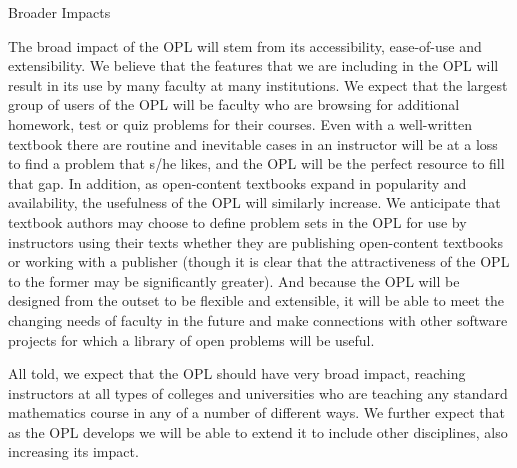 \documentclass[11pt]{article}
\begin{document}
\begin{section}{Broader Impacts}

The broad impact of the OPL will stem from its accessibility, ease-of-use
and extensibility.  We believe that the features that we are including in
the OPL will result in its use by many faculty at many institutions.  We
expect that the largest group of users of the OPL will be faculty who are
browsing for additional homework, test or quiz problems for their courses.
Even with a well-written textbook there are routine and inevitable cases
in an instructor will be at a loss to find a problem that s/he likes, and
the OPL will be the perfect resource to fill that gap.  In addition, as
open-content textbooks expand in popularity and availability, the
usefulness of the OPL will similarly increase.  We anticipate that
textbook authors may choose to define problem sets in the OPL for use by
instructors using their texts whether they are publishing open-content
textbooks or working with a publisher (though it is clear that the
attractiveness of the OPL to the former may be significantly greater).
And because the OPL will be designed from the outset to be flexible and
extensible, it will be able to meet the changing needs of faculty in the
future and make connections with other software projects for which a
library of open problems will be useful.

All told, we expect that the OPL should have very broad impact, reaching
instructors at all types of colleges and universities who are teaching any
standard mathematics course in any of a number of different ways.  We
further expect that as the OPL develops we will be able to extend it to
include other disciplines, also increasing its impact.

\end{section}
\end{document}
